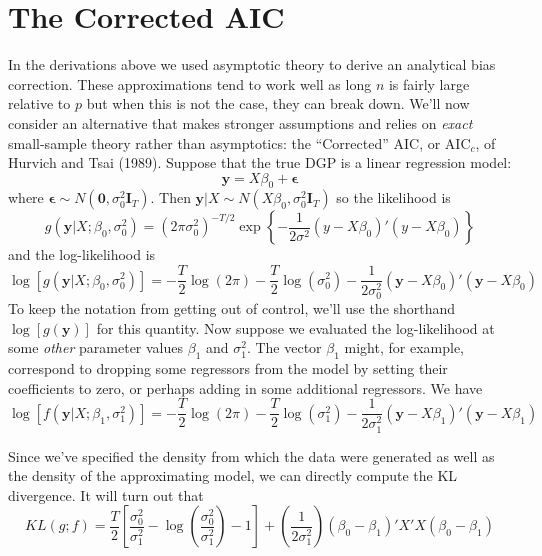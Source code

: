 \documentclass[12pt]{article}
\theoremstyle{definition}
\begin{document}
\section{The Corrected AIC}
In the derivations above we used asymptotic theory to derive an analytical bias correction. These approximations tend to work well as long $n$ is fairly large relative to $p$ but when this is not the case, they can break down. We'll now consider an alternative that makes stronger assumptions and relies on \emph{exact} small-sample theory rather than asymptotics: the ``Corrected'' AIC, or AIC$
_c$, of Hurvich and Tsai (1989). Suppose that the true DGP is a linear regression model:
$$\textbf{y} = X\beta_0 + \boldsymbol{\epsilon}$$
where $\mathbf{\epsilon} \sim N(\mathbf{0}, \sigma_0^2 \mathbf{I}_T)$. Then $\mathbf{y}|X \sim N(X\beta_0, \sigma_0^2 \mathbf{I}_T)$ so the likelihood is
$$g(\textbf{y}|X;\beta_0, \sigma^2_0) = \left(2\pi\sigma_0^2\right)^{-T/2} \exp\left\{ -\frac{1}{2\sigma^2}(y - X\beta_0)'(y - X\beta_0)\right\}$$
and the log-likelihood is
$$\log\left[g(\textbf{y}|X;\beta_0, \sigma_0^2)\right] = -\frac{T}{2}\log(2\pi) -\frac{T}{2} \log(\sigma^2_0) - \frac{1}{2\sigma_0^2}\left(\textbf{y} - X\beta_0\right)'\left(\textbf{y} -X\beta_0\right)$$
To keep the notation from getting out of control, we'll use the shorthand $\log[g(\mathbf{y})]$ for this quantity. Now suppose we evaluated the log-likelihood at some \emph{other} parameter values $\beta_1$ and $\sigma^2_1$. The vector $\beta_1$ might, for example, correspond to dropping some regressors from the model by setting their coefficients to zero, or perhaps adding in some additional regressors. We have
$$\log[f(\textbf{y}|X;\beta_1, \sigma_1^2)] = -\frac{T}{2}\log(2\pi) -\frac{T}{2} \log(\sigma^2_1) - \frac{1}{2\sigma_1^2}\left(\textbf{y} - X\beta_1\right)'\left(\textbf{y} -X\beta_1\right)$$

Since we've specified the density from which the data were generated as well as the density of the approximating model, we can directly compute the KL divergence. It will turn out that
$$KL(g;f) = \frac{T}{2}\left[\frac{\sigma_0^2}{\sigma_1^2} - \log\left(\frac{\sigma_0^2}{\sigma_1^2}\right) - 1 \right] + \left(\frac{1}{2 \sigma_1^2}\right)\left(\beta_0 - \beta_1\right)'X'X\left(\beta_0 - \beta_1\right)$$
\end{document}

